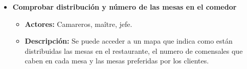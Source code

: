 \documentclass[spanish,a4paper,12pt]{report}		%
\begin{document}
\begin{itemize}
\begin{itemize}
\begin{itemize}
			\end {itemize}
		\end{itemize}%


		\item \textbf{Comprobar distribución y número de las mesas en el comedor}
			\begin{itemize}
				\item \textbf{Actores:} Camareros, maître, jefe.
				\item \textbf{Descripción:} Se puede acceder a un mapa que indica como están distribuidas las mesas en el restaurante, el numero de comensales que caben en cada mesa y las mesas preferidas por los clientes.
			\end {itemize}



\end{itemize}
\end{document}

